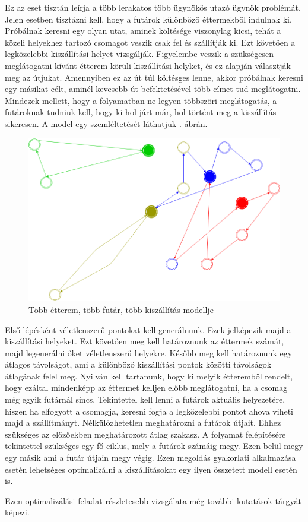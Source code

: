 

Ez az eset tisztán leírja a több lerakatos több ügynökös utazó ügynök problémát. Jelen esetben tisztázni kell, hogy a futárok különböző éttermekből indulnak ki. Próbálnak keresni egy olyan utat, aminek költésége viszonylag kicsi, tehát a közeli helyekhez tartozó csomagot veszik csak fel és szállítják ki. Ezt követően a legközelebbi kiszállítási helyet vizsgálják. Figyelembe veszik a szükségesen meglátogatni kívánt étterem körüli kiszállítási helyket, és ez alapján választják meg az útjukat. Amennyiben ez az út túl költésges lenne, akkor próbálnak keresni egy másikat célt, aminél kevesebb út befektetésével több címet tud meglátogatni. Mindezek mellett, hogy a folyamatban ne legyen többszöri meglátogatás, a futároknak tudniuk kell, hogy ki hol járt már, hol történt meg a kiszállítás sikeresen.
A model egy szemléltetését láthatjuk . ábrán.

\begin{figure}[h!]
\centering
\includegraphics[scale=0.45]{images/model5.png}
\caption{Több étterem, több futár, több kiszállítás modellje}
\label{fig:model5}
\end{figure}


Első lépésként véletlenszerű pontokat kell generálnunk. Ezek jelképezik majd a kiszállítási helyeket. Ezt követően meg kell határoznunk az éttermek számát, majd legenerálni őket véletlenszerű helyekre. Később meg kell határoznunk egy átlagos távolságot, ami a különböző kiszállítási pontok közötti távolságok átlagának felel meg. Nyilván kell tartanunk, hogy ki melyik étteremből rendelt, hogy ezáltal mindenképp az éttermet kelljen előbb meglátogatni, ha a csomag még egyik futárnál sincs. Tekintettel kell lenni a futárok aktuális helyezetére, hiszen ha elfogyott a csomagja, keresni fogja a legközelebbi pontot ahova viheti majd a szállítmányt. Nélkülözhetetlen meghatározni a futárok útjait. Ehhez szükséges az előzőekben meghatározott átlag szakasz. A folyamat felépítésére tekintettel szükséges egy fő ciklus, mely a futárok számáig megy. Ezen belül megy egy másik ami a futár útjain megy végig. Ezen megoldás gyakorlati alkalmazása esetén lehetséges optimalizálni a kiszállításokat egy ilyen összetett modell esetén is.

Ezen optimalizálási feladat részletesebb vizsgálata még további kutatások tárgyát képezi.
